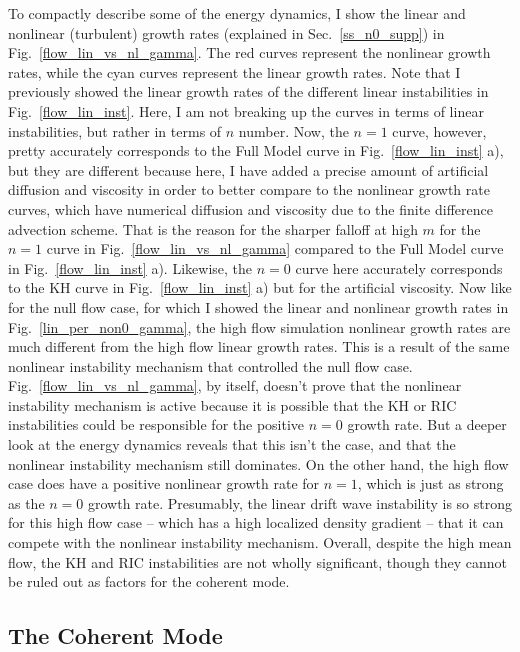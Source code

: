 To compactly describe some of the energy dynamics, I show the linear and nonlinear (turbulent) growth rates (explained in Sec.~\ref{ss_n0_supp}) in Fig.~\ref{flow_lin_vs_nl_gamma}. 
The red curves represent the nonlinear growth rates, while the cyan curves represent the linear growth rates. Note that I previously showed the linear growth rates of the different linear instabilities
in Fig.~\ref{flow_lin_inst}. Here, I am not breaking up the curves in terms of linear instabilities, but rather in terms of $n$ number. Now, the $n=1$ curve, however, pretty accurately
corresponds to the Full Model curve in Fig.~\ref{flow_lin_inst} a), but they are different because here, I have added a precise amount of artificial diffusion and viscosity in order to better compare to
the nonlinear growth rate curves, which have numerical diffusion and viscosity due to the finite difference advection scheme. That is the reason for the sharper falloff at high $m$ for the $n=1$
curve in Fig.~\ref{flow_lin_vs_nl_gamma} compared to the Full Model curve in Fig.~\ref{flow_lin_inst} a). Likewise, the $n=0$ curve here accurately corresponds to the KH curve
in Fig.~\ref{flow_lin_inst} a) but for the artificial viscosity.
Now like for the null flow case, for which I showed the linear and nonlinear growth rates in Fig.~\ref{lin_per_non0_gamma}, the high flow simulation nonlinear growth rates are 
much different from the high flow linear growth rates. This is a result of the same nonlinear instability mechanism that controlled the null flow case. Fig.~\ref{flow_lin_vs_nl_gamma}, by itself,
doesn't prove that the nonlinear instability mechanism is active because it is possible that the KH or RIC instabilities could be responsible for the positive $n=0$ growth rate. But a deeper look at
the energy dynamics reveals that this isn't the case, and that the nonlinear instability mechanism still dominates.
On the other hand, the high flow case does have a positive nonlinear growth rate for $n=1$, which is just as strong as the $n=0$ growth rate. Presumably, the linear drift wave instability is
so strong for this high flow case -- which has a high localized density gradient -- that it can compete with the nonlinear instability mechanism. Overall, despite the high mean flow,
the KH and RIC instabilities are not wholly significant, though they cannot be ruled out as factors for the coherent mode.

\subsection{The Coherent Mode}
\label{ss_coherent_mode}

